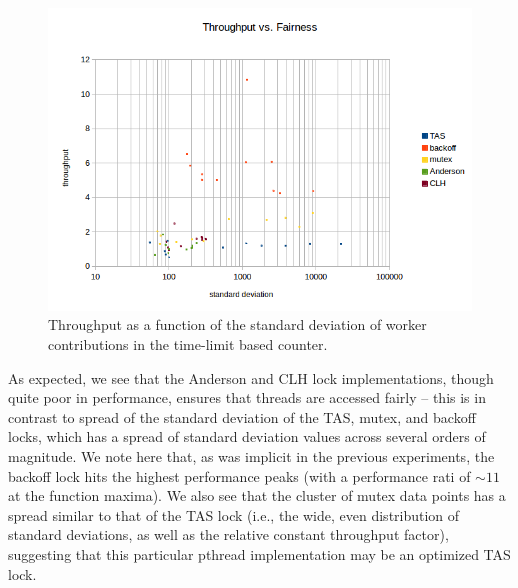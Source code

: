 \documentclass{article}
\newcommand{\cpart}[1]{\newblock{\LARGE {\\\\#1}}}
\begin{document}
\begin{figure}
\begin{center}
	\includegraphics[scale=.8]{counter_5.png}
	\caption{Throughput as a function of the standard deviation of worker contributions in the time-limit based counter.}
	\label{counter_5}
\end{center}
\end{figure}

As expected, we see that the Anderson and CLH lock implementations, though quite poor in performance, ensures that threads are accessed fairly -- this is in 
contrast to spread of the standard deviation of the TAS, mutex, and backoff locks, which has a spread of standard deviation values across several orders of 
magnitude. We note here that, as was implicit in the previous experiments, the backoff lock hits the highest performance peaks (with a performance rati of $\sim 11$ 
at the function maxima). We also see that the cluster of mutex data points has a spread similar to that of the TAS lock (i.e., the wide, even distribution of 
standard deviations, as well as the relative constant throughput factor), suggesting that this particular pthread implementation may be an optimized TAS lock.

\cpart{Packet Overhead}
\end{document}

